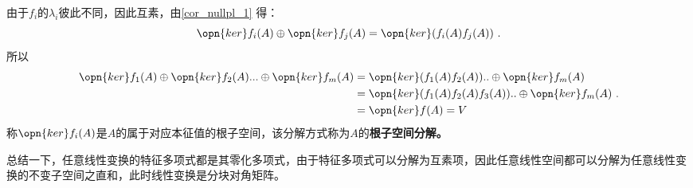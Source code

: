由于$f_i$的$\lambda_i$彼此不同，因此互素，由\autoref{cor_nullpl_1} 得：
\begin{equation}
\opn{ker}f_i(A)\oplus \opn{ker}f_j(A)=\opn{ker}(f_i(A)f_j(A))~.
\end{equation}
所以
\begin{equation}
\begin{aligned}
\opn{ker}f_1(A)\oplus\opn{ker}f_2(A)...\oplus\opn{ker}f_m(A)&=\opn{ker}(f_1(A)f_2(A))..\oplus\opn{ker}f_m(A)\\
&=\opn{ker}(f_1(A)f_2(A)f_3(A))..\oplus\opn{ker}f_m(A)\\
&=\opn{ker}f(A)=V
\end{aligned}
~.
\end{equation}
称$\opn{ker}f_i(A)$是$A$的属于对应本征值的根子空间，该分解方式称为$A$的\textbf{根子空间分解。}

总结一下，任意线性变换的特征多项式都是其零化多项式，由于特征多项式可以分解为互素项，因此任意线性空间都可以分解为任意线性变换的不变子空间之直和，此时线性变换是分块对角矩阵。


